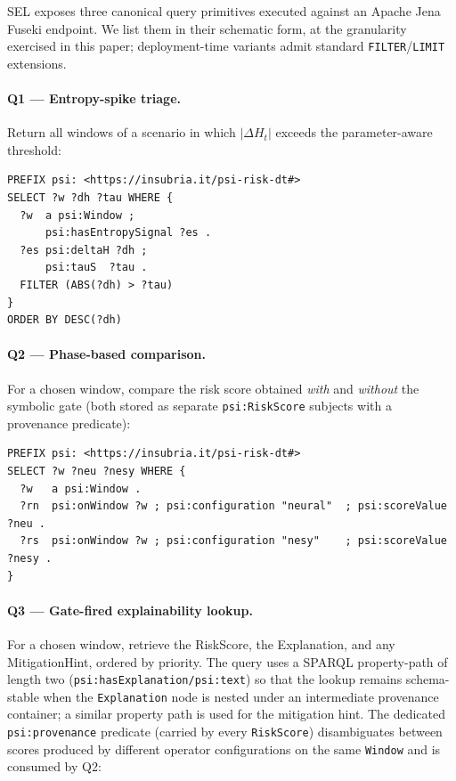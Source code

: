 \documentclass[runningheads]{llncs}
\newcommand{\EntropyDeviation}{\ensuremath{\Delta H}}
\begin{document}
SEL exposes three canonical query primitives executed against an Apache
Jena Fuseki endpoint. We list them in their schematic form, at the
granularity exercised in this paper; deployment-time variants admit
standard \texttt{FILTER}/\texttt{LIMIT} extensions.

\paragraph{Q1 --- Entropy-spike triage.} Return all windows of a
scenario in which $|\EntropyDeviation_t|$ exceeds the parameter-aware threshold:

\begin{lstlisting}[language=SPARQL]
PREFIX psi: <https://insubria.it/psi-risk-dt#>
SELECT ?w ?dh ?tau WHERE {
  ?w  a psi:Window ;
      psi:hasEntropySignal ?es .
  ?es psi:deltaH ?dh ;
      psi:tauS  ?tau .
  FILTER (ABS(?dh) > ?tau)
}
ORDER BY DESC(?dh)
\end{lstlisting}

\paragraph{Q2 --- Phase-based comparison.} For a chosen window, compare
the risk score obtained \emph{with} and \emph{without} the symbolic gate
(both stored as separate \texttt{psi:RiskScore} subjects with a
provenance predicate):

\begin{lstlisting}[language=SPARQL]
PREFIX psi: <https://insubria.it/psi-risk-dt#>
SELECT ?w ?neu ?nesy WHERE {
  ?w   a psi:Window .
  ?rn  psi:onWindow ?w ; psi:configuration "neural"  ; psi:scoreValue ?neu .
  ?rs  psi:onWindow ?w ; psi:configuration "nesy"    ; psi:scoreValue ?nesy .
}
\end{lstlisting}

\paragraph{Q3 --- Gate-fired explainability lookup.} For a chosen
window, retrieve the RiskScore, the Explanation, and any
MitigationHint, ordered by priority. The query uses a SPARQL
property-path of length two (\texttt{psi:hasExplanation/psi:text}) so
that the lookup remains schema-stable when the \texttt{Explanation} node
is nested under an intermediate provenance container; a similar property
path is used for the mitigation hint. The dedicated
\texttt{psi:provenance} predicate (carried by every \texttt{RiskScore})
disambiguates between scores produced by different operator
configurations on the same \texttt{Window} and is consumed by Q2:
\end{document}

